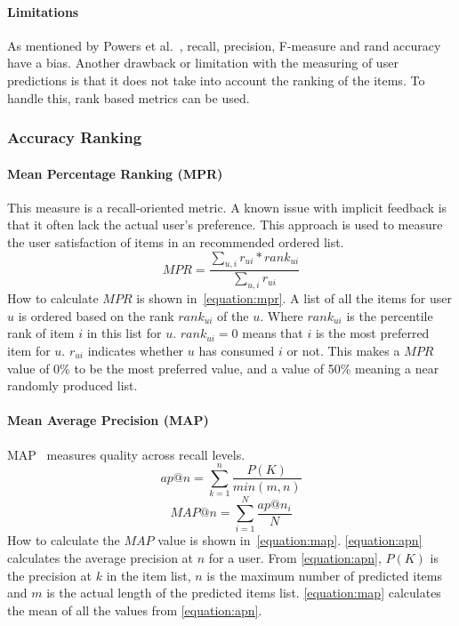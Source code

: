 \paragraph{Limitations}
\label{subp:limitations}
As mentioned by Powers et al.~\cite{powers2007}, recall, precision, F-measure and rand accuracy have a bias.
Another drawback or limitation with the measuring of user predictions is that it does not take into account the ranking of the items.
To handle this, rank based metrics can be used.

\subsubsection{Accuracy Ranking} %
\label{par:accuracy_ranking}
\paragraph{Mean Percentage Ranking (MPR)}
\label{subp:mean_percentage_ranking_}
This measure is a recall-oriented metric.
A known issue with implicit feedback is that it often lack the actual user's preference.
This approach is used to measure the user satisfaction of items in an recommended ordered list.
\begin{equation}
	MPR = \frac{\sum_{u,i}{r_{ui} * rank_{ui}}}{\sum_{u,i}{r_{ui}}}
	\label{equation:mpr}
\end{equation}
How to calculate $MPR$ is shown in~\ref{equation:mpr}.
A list of all the items for user $u$ is ordered based on the rank $rank_{ui}$ of the $u$.
Where $rank_{ui}$ is the percentile rank of item $i$ in this list for $u$.
$rank_{ui} = 0$ means that $i$ is the most preferred item for $u$.
$r_{ui}$ indicates whether $u$ has consumed $i$ or not.
This makes a $MPR$ value of 0\% to be the most preferred value, and a value of 50\% meaning a near randomly produced list.

\paragraph{Mean Average Precision (MAP)}
\label{subp:mean_average_precision_map_}
MAP~\cite{Manning:2008:IIR:1394399} measures quality across recall levels.
\begin{equation}
	ap@n = \sum_{k=1}^{n}{\frac{P(K)}{min(m,n)}}
	\label{equation:apn}
\end{equation}
\begin{equation}
	MAP@n = \sum_{i=1}^{N}{\frac{ap@n_i}{N}}
	\label{equation:map}
\end{equation}
How to calculate the $MAP$ value is shown in~\ref{equation:map}.
\ref{equation:apn} calculates the average precision at $n$ for a user.
From \ref{equation:apn}, $P(K)$ is the precision at $k$ in the item list, $n$ is the maximum number of predicted items and $m$ is the actual length of the predicted items list.
\ref{equation:map} calculates the mean of all the values from \ref{equation:apn}.

